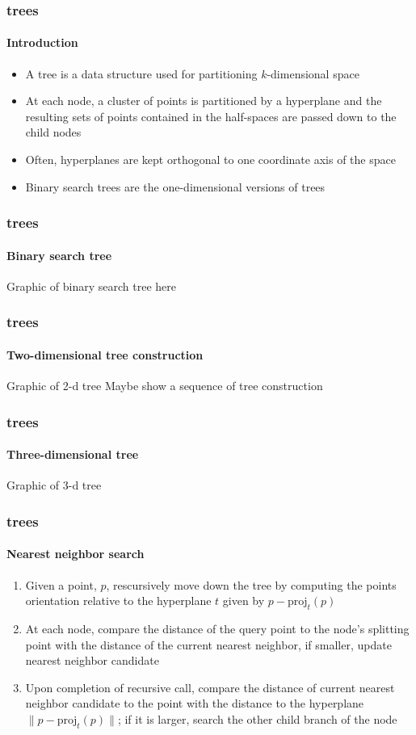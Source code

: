 

\begin{frame}
  \frametitle{\kd trees}
  \framesubtitle{Introduction}

  \begin{itemize}
    \item A \kd tree is a data structure used for partitioning $k$-dimensional space
    \item At each node, a cluster of points is partitioned by a hyperplane and the resulting
      sets of points contained in the half-spaces are passed down to the child nodes
    \item Often, hyperplanes are kept orthogonal to one coordinate axis of the space
    \item Binary search trees are the one-dimensional versions of \kd trees
  \end{itemize}

\end{frame}

\begin{frame}
  \frametitle{\kd trees}
  \framesubtitle{Binary search tree}
  
  Graphic of binary search tree here
  
\end{frame}

\begin{frame}
  \frametitle{\kd trees}
  \framesubtitle{Two-dimensional \kd tree construction}
  
  Graphic of 2-d tree
  Maybe show a sequence of tree construction 
  
\end{frame}

\begin{frame}
  \frametitle{\kd trees}
  \framesubtitle{Three-dimensional \kd tree}
  
  Graphic of 3-d tree
  
\end{frame}

\begin{frame}
  \frametitle{\kd trees}
  \framesubtitle{Nearest neighbor search}

  \begin{enumerate}
    \item Given a point, $p$, rescursively move down the tree by computing the points orientation relative to the 
      hyperplane $t$ given by $p - \text{proj}_t(p)$
    \item At each node, compare the distance of the query point to the node's splitting point with the distance
      of the current nearest neighbor, if smaller, update nearest neighbor candidate
    \item Upon completion of recursive call, compare the distance of current nearest neighbor 
      candidate to the point with the distance to the hyperplane $\|p - \text{proj}_t(p)\|$; 
      if it is larger, search the other child branch of the node
  \end{enumerate}

\end{frame}


